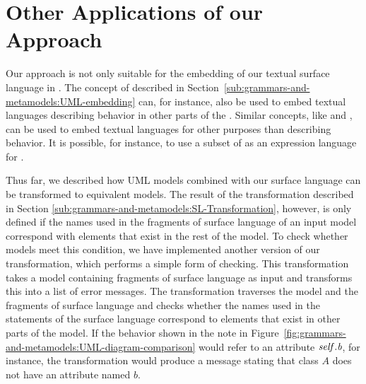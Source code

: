 \section{Other Applications of our Approach}
\label{sec:grammars-and-metamodels:Other-Applications-of}

Our approach is not only suitable for the embedding of our textual surface language in \Activities.
The concept of \OpaqueBehavior described in Section~\ref{sub:grammars-and-metamodels:UML-embedding} can, for instance, also be used to embed textual languages describing behavior in other parts of the \UML.
Similar concepts, like \OpaqueExpression and \OpaqueAction, can be used to embed textual languages for other purposes than describing behavior.
It is possible, for instance, to use a subset of \Java as an expression language for \UML \StateMachines.

Thus far, we described how UML models combined with our surface language can be transformed to equivalent \UML models.
The result of the transformation described in Section \ref{sub:grammars-and-metamodels:SL-Transformation}, however, is only defined if the names used in the fragments of surface language of an input model correspond with elements that exist in the rest of the model.
To check whether models meet this condition, we have implemented another version of our transformation, which performs a simple form of checking.
This transformation takes a \UML model containing fragments of surface language as input and transforms this into a list of error messages.
The transformation traverses the model and the fragments of surface language and checks whether the names used in the statements of the surface language correspond to elements that exist in other parts of the model.
If the behavior shown in the note in Figure~\ref{fig:grammars-and-metamodels:UML-diagram-comparison} would refer to an attribute $\it{self.b}$, for instance, the transformation would produce a message stating that class $A$ does not have an attribute named $b$. 